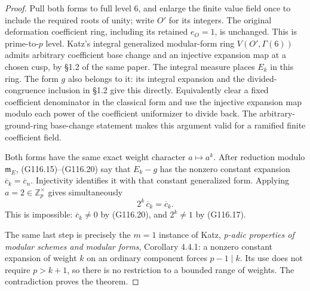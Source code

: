 \begin{proof}
Pull both forms to full level \(6\), and enlarge the finite
value field once to include the required roots of unity; write
\(O'\) for its integers.  The original deformation coefficient
ring, including its retained \(e_O=1\), is unchanged.
This is prime-to-\(p\) level.  Katz's integral generalized
modular-form ring \(V(O',\Gamma(6))\) admits arbitrary
coefficient base change and an injective expansion map at a
chosen cusp, by \S1.2 of the same paper.
The integral measure places \(E_k\) in this ring.
The form \(g\) also belongs to it: its integral expansion
and the divided-congruence inclusion in \S1.2 give this
directly.  Equivalently clear a fixed coefficient denominator
in the classical form and use the injective expansion map
modulo each power of the coefficient uniformizer to divide
back.  The arbitrary-ground-ring base-change statement makes
this argument valid for a ramified finite coefficient field.

Both forms have the same exact weight character \(a\mapsto a^k\).
After reduction modulo \(\mathfrak m_E\), (G116.15)--(G116.20)
say that \(E_k-g\) has the nonzero constant expansion
\(\overline c_k=\overline c_n\).  Injectivity identifies it
with that constant generalized form.  Applying
\(a=2\in\mathbb Z_p^\times\) gives simultaneously
\[
                        2^k\,\overline c_k=\overline c_k.
 \tag{G116.21}
\]
This is impossible: \(\overline c_k\ne0\) by (G116.20),
and \(2^k\ne1\) by (G116.17).

The same last step is precisely the \(m=1\) instance of
Katz, \emph{p-adic properties of modular schemes and modular
forms}, Corollary 4.4.1: a nonzero constant expansion of
weight \(k\) on an ordinary component forces \(p-1\mid k\).
Its use does not require \(p>k+1\), so there is no restriction
to a bounded range of weights.  The contradiction proves the
theorem.
\end{proof}

